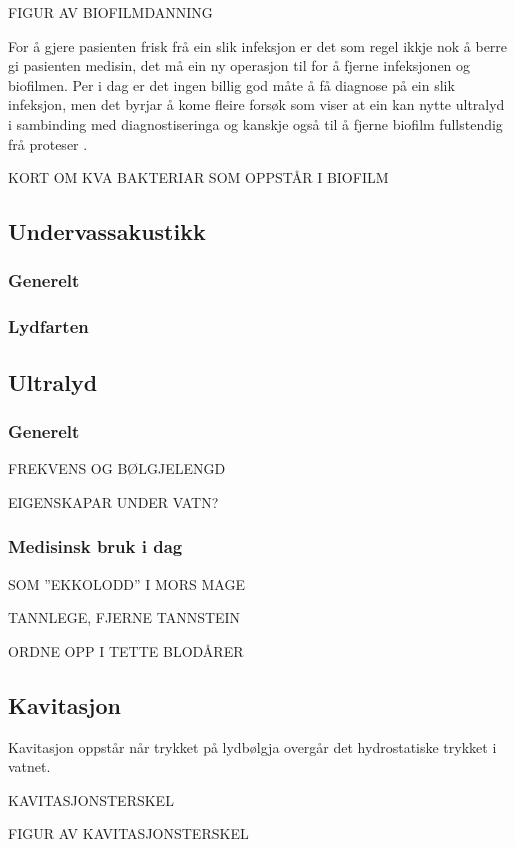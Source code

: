 \documentclass[12pt,norsk]{article}
\begin{document}
FIGUR AV BIOFILMDANNING

For å gjere pasienten frisk frå ein slik infeksjon er det som regel ikkje nok å berre gi pasienten medisin, det må ein ny operasjon til for å fjerne infeksjonen og biofilmen\cite{infection}. Per i dag er det ingen billig god måte å få diagnose på ein slik infeksjon, men det byrjar å kome fleire forsøk som viser at ein kan nytte ultralyd i sambinding med diagnostiseringa og kanskje også til å fjerne biofilm fullstendig frå proteser \cite{ultraprotese}.

KORT OM KVA BAKTERIAR SOM OPPSTÅR I BIOFILM
\subsection{Undervassakustikk}
\subsubsection*{Generelt}

\subsubsection*{Lydfarten}

\subsection{Ultralyd}
\subsubsection*{Generelt}
FREKVENS OG BØLGJELENGD

EIGENSKAPAR UNDER VATN?

\subsubsection*{Medisinsk bruk i dag}
SOM ''EKKOLODD'' I MORS MAGE

TANNLEGE, FJERNE TANNSTEIN

ORDNE OPP I TETTE BLODÅRER

\subsection{Kavitasjon}
Kavitasjon oppstår når trykket på lydbølgja overgår det hydrostatiske trykket i vatnet.\cite{Kinsler:2000rc}

KAVITASJONSTERSKEL

FIGUR AV KAVITASJONSTERSKEL
\end{document}
